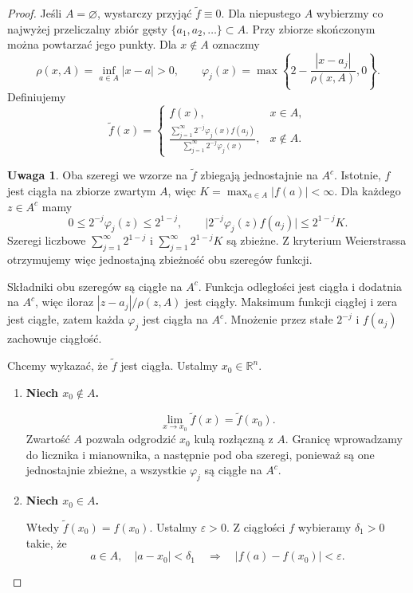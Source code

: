 \documentclass[12pt,a4paper]{article}
\theoremstyle{definition}
\newtheorem{uwaga}{Uwaga}
\theoremstyle{plain}
\newcommand{\R}{\mathbb{R}}
\begin{document}
\begin{proof}
Jeśli $A=\varnothing$, wystarczy przyjąć $\widetilde{f}\equiv0$.
Dla niepustego $A$ wybierzmy co najwyżej przeliczalny zbiór gęsty
$\{a_1,a_2,\ldots\}\subset A$. Przy zbiorze skończonym można powtarzać
jego punkty. Dla $x\notin A$ oznaczmy
\[
  \rho(x,A)=\inf_{a\in A}|x-a|>0,
  \qquad
  \varphi_j(x)=\max\left\{2-\frac{|x-a_j|}{\rho(x,A)},0\right\}.
\]
Definiujemy
\[
  \widetilde{f}(x)=
  \begin{cases}
    f(x), & x\in A,\\[2mm]
    \displaystyle
    \frac{\sum_{j=1}^{\infty}2^{-j}\varphi_j(x)f(a_j)}
         {\sum_{j=1}^{\infty}2^{-j}\varphi_j(x)}, & x\notin A.
  \end{cases}
\]

\begin{uwaga}
Oba szeregi we wzorze na $\widetilde{f}$ zbiegają jednostajnie na $A^c$.
Istotnie, $f$ jest ciągła na zbiorze zwartym $A$, więc
$K=\max_{a\in A}|f(a)|<\infty$. Dla każdego $z\in A^c$ mamy
\[
  0\leq 2^{-j}\varphi_j(z)\leq 2^{1-j},
  \qquad
  \bigl|2^{-j}\varphi_j(z)f(a_j)\bigr|\leq 2^{1-j}K.
\]
Szeregi liczbowe $\sum_{j=1}^{\infty}2^{1-j}$ i
$\sum_{j=1}^{\infty}2^{1-j}K$ są zbieżne. Z kryterium Weierstrassa
otrzymujemy więc jednostajną zbieżność obu szeregów funkcji.

Składniki obu szeregów są ciągłe na $A^c$. Funkcja odległości jest ciągła
i dodatnia na $A^c$, więc iloraz $|z-a_j|/\rho(z,A)$ jest ciągły.
Maksimum funkcji ciągłej i zera jest ciągłe, zatem każda $\varphi_j$ jest
ciągła na $A^c$. Mnożenie przez stałe $2^{-j}$ i $f(a_j)$ zachowuje ciągłość.
\end{uwaga}

\medskip
Chcemy wykazać, że $\widetilde{f}$ jest ciągła. Ustalmy $x_0\in\R^n$.

\begin{enumerate}
  \item[$1^\circ$] \textbf{Niech $x_0\notin A$.}

  \[
    \lim_{x\to x_0}\widetilde{f}(x)=\widetilde{f}(x_0).
  \]
  Zwartość $A$ pozwala odgrodzić $x_0$ kulą rozłączną z $A$.
  Granicę wprowadzamy do licznika i mianownika, a następnie pod oba szeregi,
  ponieważ są one jednostajnie zbieżne, a wszystkie $\varphi_j$ są ciągłe na $A^c$.

  \item[$2^\circ$] \textbf{Niech $x_0\in A$.}

  Wtedy $\widetilde{f}(x_0)=f(x_0)$. Ustalmy $\varepsilon>0$.
  Z ciągłości $f$ wybieramy $\delta_1>0$ takie, że
  \[
    a\in A,\quad |a-x_0|<\delta_1
    \quad\Longrightarrow\quad
    |f(a)-f(x_0)|<\varepsilon.
  \]


\end{enumerate}
\end{proof}
\end{document}
